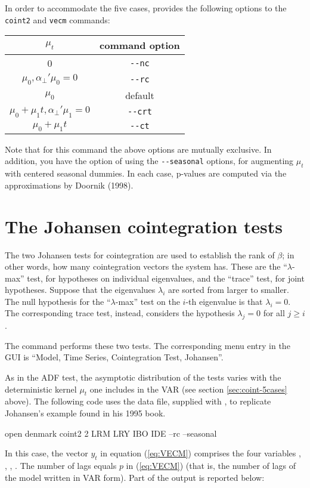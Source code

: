 In order to accommodate the five cases,  provides the
following options to the \texttt{coint2} and \texttt{vecm} commands:
\begin{center}
  \begin{tabular}{cc}
    \hline
    $\mu_t$ & command option \\
    \hline
    0 & \verb|--nc| \\
    $\mu_0, \alpha_{\perp}'\mu_0 = 0 $ &  \verb|--rc| \\
    $\mu_0$ &  default \\
    $\mu_0 + \mu_1 t , \alpha_{\perp}'\mu_1 = 0$ &  \verb|--crt| \\
    $\mu_0 + \mu_1 t$ &  \verb|--ct| \\
    \hline
  \end{tabular}
\end{center}
Note that for this command the above options are mutually exclusive.
In addition, you have the option of using the \verb|--seasonal|
options, for augmenting $\mu_t$ with centered seasonal dummies.  In
each case, p-values are computed via the approximations by Doornik
(1998).

\section{The Johansen cointegration tests}
\label{sec:johansen-test}

The two Johansen tests for cointegration are used to establish the
rank of $\beta$; in other words, how many cointegration vectors the
system has.  These are the ``$\lambda$-max'' test, for hypotheses on
individual eigenvalues, and the ``trace'' test, for joint hypotheses.
Suppose that the eigenvalues $\lambda_i$ are sorted from larger to
smaller. The null hypothesis for the ``$\lambda$-max'' test on the
$i$-th eigenvalue is that $\lambda_i = 0$. The corresponding trace
test, instead, considers the hypothesis $\lambda_j = 0$ for all $j \ge
i$.


The  command  performs these two
tests. The corresponding menu entry in the GUI is ``Model, Time
Series, Cointegration Test, Johansen''.

As in the ADF test, the asymptotic distribution of the tests varies
with the deterministic kernel $\mu_t$ one includes in the VAR (see
section \ref{sec:coint-5cases} above). The following code uses the
 data file, supplied with , to replicate
Johansen's example found in his 1995 book.
%
\begin{code}
open denmark
coint2 2 LRM LRY IBO IDE --rc --seasonal
\end{code}
%
In this case, the vector $y_t$ in equation (\ref{eq:VECM}) comprises
the four variables , , , . The
number of lags equals $p$ in (\ref{eq:VECM}) (that is, the number of
lags of the model written in VAR form). Part of the output is reported
below:

